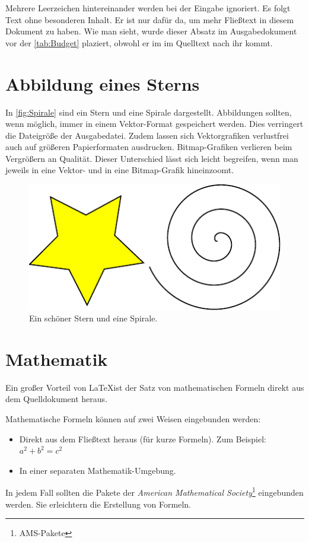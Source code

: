\documentclass{scrbook}
\begin{document}
Mehrere Leerzeichen hintereinander werden bei der Eingabe ignoriert. Es folgt Text ohne besonderen Inhalt. Er ist nur dafür da, um mehr Fließtext in diesem Dokument zu haben. Wie man sieht, wurde dieser Absatz im Ausgabedokument vor der \autoref{tab:Budget} plaziert, obwohl er im im Quelltext nach ihr kommt.

\section{Abbildung eines Sterns}
In \autoref{fig:Spirale} sind ein Stern und eine Spirale dargestellt. Abbildungen sollten, wenn möglich, immer in einem Vektor-Format gespeichert werden. Dies verringert die Dateigröße der Ausgabedatei. Zudem lassen sich Vektorgrafiken verlustfrei auch auf größeren Papierformaten ausdrucken. Bitmap-Grafiken verlieren beim Vergrößern an Qualität. Dieser Unterschied lässt sich leicht begreifen, wenn man jeweils in eine Vektor- und in eine Bitmap-Grafik hineinzoomt.

\begin{figure}[htb]
	\centering
	\includegraphics[width=0.5\columnwidth]{Stern.pdf}
	\caption{Ein schöner Stern und eine Spirale.}
	\label{fig:Spirale}
\end{figure}

\section{Mathematik}
Ein großer Vorteil von \LaTeX ist der Satz von mathematischen Formeln direkt aus dem Quelldokument heraus.

Mathematische Formeln können auf zwei Weisen eingebunden werden:
\begin{itemize}
	\item Direkt aus dem Fließtext heraus (für kurze Formeln). Zum Beispiel: $a^2 + b^2 = c^2$
	\item In einer separaten Mathematik-Umgebung.
\end{itemize}

In jedem Fall sollten die Pakete der \emph{American Mathematical Society}\footnote{AMS-Pakete} eingebunden werden. Sie erleichtern die Erstellung von Formeln.
\end{document}
